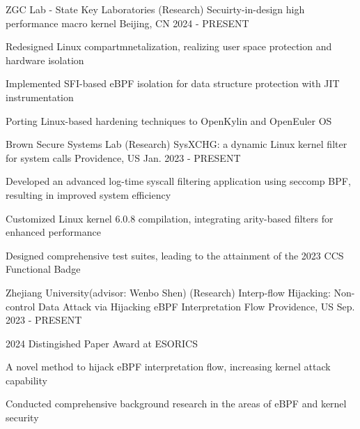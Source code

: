 \begin{cventries}

  \cventry
    {ZGC Lab - State Key Laboratories}
    {(Research) Secuirty-in-design high performance macro kernel}
    {Beijing, CN}
    {2024 - PRESENT}
    {
      \begin{cvitems}
        \item {Redesigned Linux compartmnetalization, realizing user space protection and hardware isolation}
        \item {Implemented SFI-based eBPF isolation for data structure protection with JIT instrumentation}
        \item {Porting Linux-based hardening techniques to OpenKylin and OpenEuler OS}
      \end{cvitems}
    }

  \cventry
    {Brown Secure Systems Lab}
    {(Research) SysXCHG: a dynamic Linux kernel filter for system calls}
    {Providence, US}
    {Jan. 2023 - PRESENT}
    {
      \begin{cvitems}
        \item {Developed an advanced log-time syscall filtering application using seccomp BPF, resulting in improved system efficiency}
        \item {Customized Linux kernel 6.0.8 compilation, integrating arity-based filters for enhanced performance}
        \item {Designed comprehensive test suites, leading to the attainment of the 2023 CCS Functional Badge}
      \end{cvitems}
    }
  
  \cventry
    {Zhejiang University(advisor: Wenbo Shen)}
    {(Research) Interp-flow Hijacking: Non-control Data Attack via Hijacking eBPF Interpretation Flow} 
    {Providence, US}
    {Sep. 2023 - PRESENT}
    {
      \begin{cvitems}
        \item {2024 Distingished Paper Award at ESORICS}
        \item {A novel method to hijack eBPF interpretation flow, increasing kernel attack capability}
        \item {Conducted comprehensive background research in the areas of eBPF and kernel security}
      \end{cvitems}
    }



\end{cventries}
